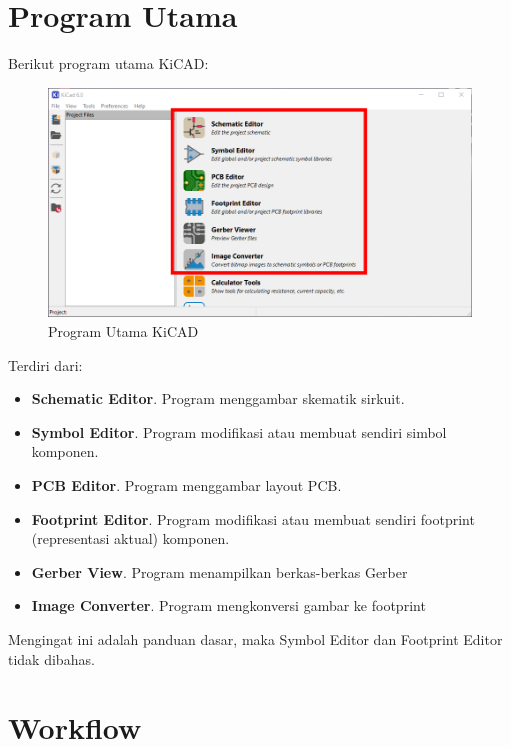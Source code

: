 \documentclass[12pt]{book}
\begin{document}
	\section{Program Utama}

	Berikut program utama KiCAD:

	\begin{figure}[!ht]
		\centering
		\includegraphics[width=\textwidth]{images/main/kicad_main}
		\caption{Program Utama KiCAD}
	\end{figure}

	Terdiri dari:
	\begin{itemize}
		\item \textbf{Schematic Editor}. Program menggambar skematik sirkuit.
		\item \textbf{Symbol Editor}. Program modifikasi atau membuat sendiri simbol komponen.
		\item \textbf{PCB Editor}. Program menggambar layout PCB.
		\item \textbf{Footprint Editor}. Program modifikasi atau membuat sendiri footprint (representasi aktual) komponen.
		\item \textbf{Gerber View}. Program menampilkan berkas-berkas Gerber
		\item \textbf{Image Converter}. Program mengkonversi gambar ke footprint
	\end{itemize}

	Mengingat ini adalah panduan dasar, maka Symbol Editor dan Footprint Editor tidak dibahas.

	\newpage
	\section{Workflow}
\end{document}
